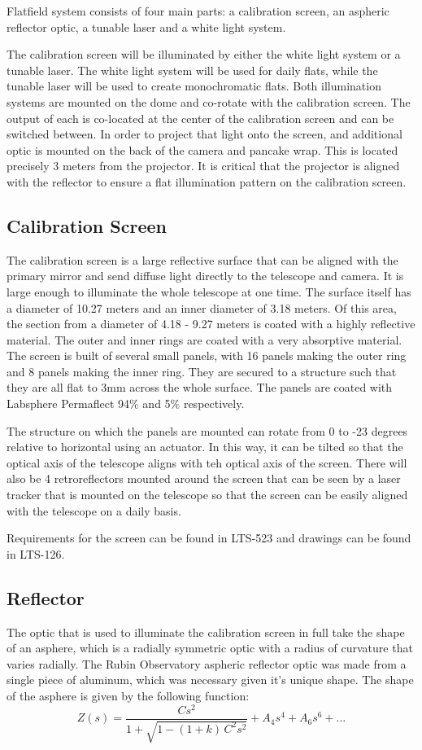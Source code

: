 \documentclass[SE,authoryear,lsstdraft,toc]{lsstdoc}
\begin{document}
Flatfield system consists of four main parts: a calibration screen, an aspheric reflector optic, a tunable laser and a white light system. 

The calibration screen will be illuminated by either the white light system or a tunable laser. The white light system will be used for daily flats, while the tunable laser will be used to create monochromatic flats. Both illumination systems are mounted on the dome and co-rotate with the calibration screen. The output of each is co-located at the center of the calibration screen and can be switched between. In order to project that light onto the screen, and additional optic is mounted on the back of the camera and pancake wrap. This is located precisely 3 meters from the projector. It is critical that the projector is aligned with the reflector to ensure a flat illumination pattern on the calibration screen. 

\subsection{Calibration Screen}
The calibration screen is a large reflective surface that can be aligned with the primary mirror and send diffuse light directly to the telescope and camera. It is large enough to illuminate the whole telescope at one time. The surface itself has a diameter of 10.27 meters and an inner diameter of 3.18 meters. Of this area, the section from a diameter of 4.18 - 9.27 meters is coated with a highly reflective material. The outer and inner rings are coated with a very absorptive material. The screen is built of several small panels, with 16 panels making the outer ring and 8 panels making the inner ring. They are secured to a structure such that they are all flat to 3mm across the whole surface. The panels are coated with Labsphere Permaflect 94\% and 5\% respectively. 

The structure on which the panels are mounted can rotate from 0 to -23 degrees relative to horizontal using an actuator. In this way, it can be tilted so that the optical axis of the telescope aligns with teh optical axis of the screen. There will also be 4 retroreflectors mounted around the screen that can be seen by a laser tracker that is mounted on the telescope so that the screen can be easily aligned with the telescope on a daily basis. 

Requirements for the screen can be found in LTS-523 and drawings can be found in LTS-126.

\subsection{Reflector}
The optic that is used to illuminate the calibration screen in full take the shape of an asphere, which is a radially symmetric optic with a radius of curvature that varies radially. The Rubin Observatory aspheric reflector optic was made from a single piece of aluminum, which was necessary given it's unique shape. The shape of the asphere is given by the following function:
\begin{equation}
Z(s) = \frac{C s^{2}}{1+\sqrt{1-(1+k)\,C^{2}s^{2}}} + A_{4}s^{4} + A_{6}s^{6} + ...
\end{equation}
\end{document}
